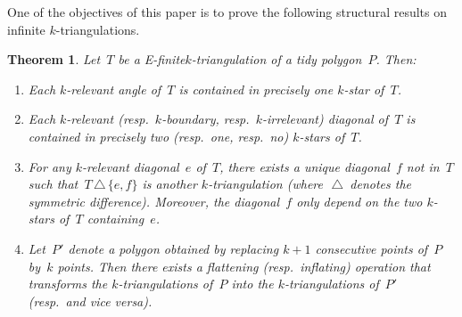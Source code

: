 \documentclass{amsart}
\newtheorem{theorem}{Theorem}[section]
\theoremstyle{remark}
\newcommand{\symdif}{\,\triangle\,} %
\newcommand{\viceversa}{\textit{vice versa}} %
\newcommand*{\ef}[0]{E-finite\xspace}
\newcommand*{\ktg}[0]{$k$-triangulation\xspace}
\begin{document}
One of the objectives of this paper is to prove the following structural results on infinite $k$-triangulations.

\begin{theorem}
\label{thm:structureInfinite}
Let~$T$ be a \ef \ktg of a tidy polygon~$P$. Then:
\begin{enumerate}
\item Each $k$-relevant angle of~$T$ is contained in precisely one $k$-star of~$T$.
\item Each $k$-relevant (resp.~$k$-boundary, resp.~$k$-irrelevant) diagonal of~$T$ is contained in precisely two (resp.~one, resp.~no) $k$-stars of~$T$.
\item For any $k$-relevant diagonal~$e$ of~$T$, there exists a unique diagonal~$f$ not in~$T$ such that~$T \symdif \{e,f\}$ is another $k$-triangulation (where~$\symdif$ denotes the symmetric difference). Moreover, the diagonal~$f$ only depend on the two $k$-stars of~$T$ containing~$e$.
\item Let~$P'$ denote a polygon obtained by replacing $k+1$ consecutive points of~$P$ by~$k$ points. Then there exists a flattening (resp.~inflating) operation that transforms the \ktg{}s of~$P$ into the \ktg{}s of~$P'$ (resp.~and \viceversa).
\end{enumerate}
\end{theorem}
\end{document}
